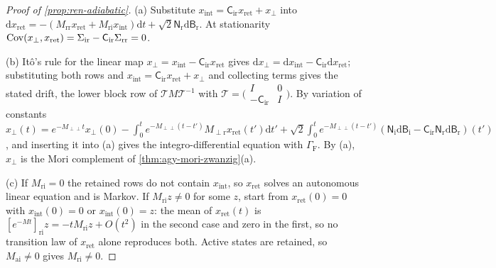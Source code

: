 \begin{proof}[Proof of \cref{prop:ren-adiabatic}]
(a) Substitute $x_{\mathrm{int}}=\mathsf C_{\mathrm{ir}}x_{\mathrm{ret}}+x_\perp$ into $\mathrm dx_{\mathrm{ret}}=-(M_{\mathrm{rr}}x_{\mathrm{ret}}+M_{\mathrm{ri}}x_{\mathrm{int}})\mathrm dt+\sqrt2\mathsf N_{\mathrm r}\mathrm d\mathsf B_{\mathrm r}$. At stationarity $\operatorname{Cov}(x_\perp,x_{\mathrm{ret}})=\Sigma_{\mathrm{ir}}-\mathsf C_{\mathrm{ir}}\Sigma_{\mathrm{rr}}=0$.

(b) Itô's rule for the linear map $x_\perp=x_{\mathrm{int}}-\mathsf C_{\mathrm{ir}}x_{\mathrm{ret}}$ gives $\mathrm dx_\perp=\mathrm dx_{\mathrm{int}}-\mathsf C_{\mathrm{ir}}\mathrm dx_{\mathrm{ret}}$; substituting both rows and $x_{\mathrm{int}}=\mathsf C_{\mathrm{ir}}x_{\mathrm{ret}}+x_\perp$ and collecting terms gives the stated drift, the lower block row of $\mathcal TM\mathcal T^{-1}$ with $\mathcal T=\bigl(\begin{smallmatrix}I&0\\-\mathsf C_{\mathrm{ir}}&I\end{smallmatrix}\bigr)$. By variation of constants $x_\perp(t)=e^{-M_{\perp\perp}t}x_\perp(0)-\int_0^te^{-M_{\perp\perp}(t-t')}M_{\perp\mathrm r}x_{\mathrm{ret}}(t')\mathrm dt'+\sqrt2\int_0^te^{-M_{\perp\perp}(t-t')}(\mathsf N_{\mathrm i}\mathrm d\mathsf B_{\mathrm i}-\mathsf C_{\mathrm{ir}}\mathsf N_{\mathrm r}\mathrm d\mathsf B_{\mathrm r})(t')$, and inserting it into (a) gives the integro-differential equation with $\Gamma_{\mathrm F}$. By (a), $x_\perp$ is the Mori complement of \cref{thm:agy-mori-zwanzig}(a).

(c) If $M_{\mathrm{ri}}=0$ the retained rows do not contain $x_{\mathrm{int}}$, so $x_{\mathrm{ret}}$ solves an autonomous linear equation and is Markov. If $M_{\mathrm{ri}}z\neq0$ for some $z$, start from $x_{\mathrm{ret}}(0)=0$ with $x_{\mathrm{int}}(0)=0$ or $x_{\mathrm{int}}(0)=z$: the mean of $x_{\mathrm{ret}}(t)$ is $[e^{-Mt}]_{\mathrm{ri}}z=-tM_{\mathrm{ri}}z+O(t^2)$ in the second case and zero in the first, so no transition law of $x_{\mathrm{ret}}$ alone reproduces both. Active states are retained, so $M_{\mathrm{ai}}\neq0$ gives $M_{\mathrm{ri}}\neq0$.
\end{proof}

